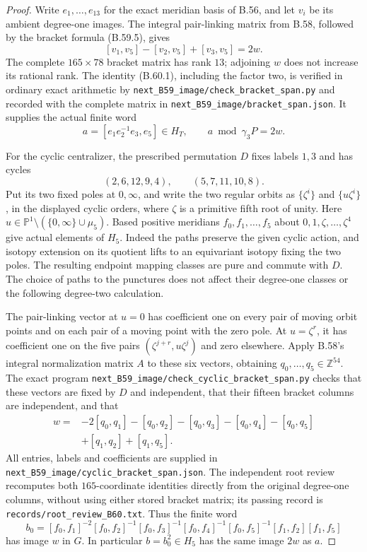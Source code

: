\begin{proof}
Write $e_1,\ldots,e_{13}$ for the exact meridian basis of
B.56, and let $v_i$ be its ambient degree-one images.
The integral pair-linking matrix from B.58, followed by
the bracket formula (B.59.5), gives
\[
 [v_1,v_5]-[v_2,v_5]+[v_3,v_5]=2w.
                                                               \tag{B.60.1}
\]
The complete $165\times78$ bracket matrix has rank $13$;
adjoining $w$ does not increase its rational rank.
The identity (B.60.1), including the factor two, is verified
in ordinary exact arithmetic by
\nolinkurl{next_B59_image/check_bracket_span.py} and recorded
with the complete matrix in
\nolinkurl{next_B59_image/bracket_span.json}.
It supplies the actual finite word
\[
                  a=[e_1e_2^{-1}e_3,e_5]\in H_T,
              \qquad a\bmod\gamma_3P=2w.                    \tag{B.60.2}
\]

For the cyclic centralizer, the prescribed permutation $D$
fixes labels $1,3$ and has cycles
\[
 (2,6,12,9,4),\qquad(5,7,11,10,8).
\]
Put its two fixed poles at $0,\infty$, and write the two
regular orbits as $\{\zeta^i\}$ and $\{u\zeta^i\}$,
in the displayed cyclic orders, where $\zeta$ is a primitive
fifth root of unity.  Here
$u\in\mathbb P^1\setminus(\{0,\infty\}\cup\mu_5)$.
Based positive meridians $f_0,f_1,\ldots,f_5$ about
$0,1,\zeta,\ldots,\zeta^4$ give actual elements of $H_5$.
Indeed the paths preserve the given cyclic action, and
isotopy extension on its quotient lifts to an equivariant
isotopy fixing the two poles.  The resulting endpoint
mapping classes are pure and commute with $D$.
The choice of paths to the punctures does not affect their
degree-one classes or the following degree-two calculation.

The pair-linking vector at $u=0$ has coefficient one
on every pair of moving orbit points and on each pair
of a moving point with the zero pole.  At $u=\zeta^r$,
it has coefficient one on the five pairs
$(\zeta^{j+r},u\zeta^j)$ and zero elsewhere.
Apply B.58's integral normalization matrix $A$ to these
six vectors, obtaining $q_0,\ldots,q_5\in\mathbb Z^{54}$.
The exact program
\nolinkurl{next_B59_image/check_cyclic_bracket_span.py}
checks that these vectors are fixed by $D$ and independent,
that their fifteen bracket columns are independent, and that
\begin{align*}
 w={}&-2[q_0,q_1]-[q_0,q_2]-[q_0,q_3]
       -[q_0,q_4]-[q_0,q_5]\\
    &+[q_1,q_2]+[q_1,q_5].                                  \tag{B.60.3}
\end{align*}
All entries, labels and coefficients are supplied in
\nolinkurl{next_B59_image/cyclic_bracket_span.json}.
The independent root review recomputes both $165$-coordinate
identities directly from the original degree-one columns,
without using either stored bracket matrix; its passing
record is \nolinkurl{records/root_review_B60.txt}.
Thus the finite word
\[
 b_0=[f_0,f_1]^{-2}[f_0,f_2]^{-1}[f_0,f_3]^{-1}
     [f_0,f_4]^{-1}[f_0,f_5]^{-1}[f_1,f_2][f_1,f_5]
                                                               \tag{B.60.4}
\]
has image $w$ in $G$.  In particular $b=b_0^2\in H_5$
has the same image $2w$ as $a$.


\end{proof}

